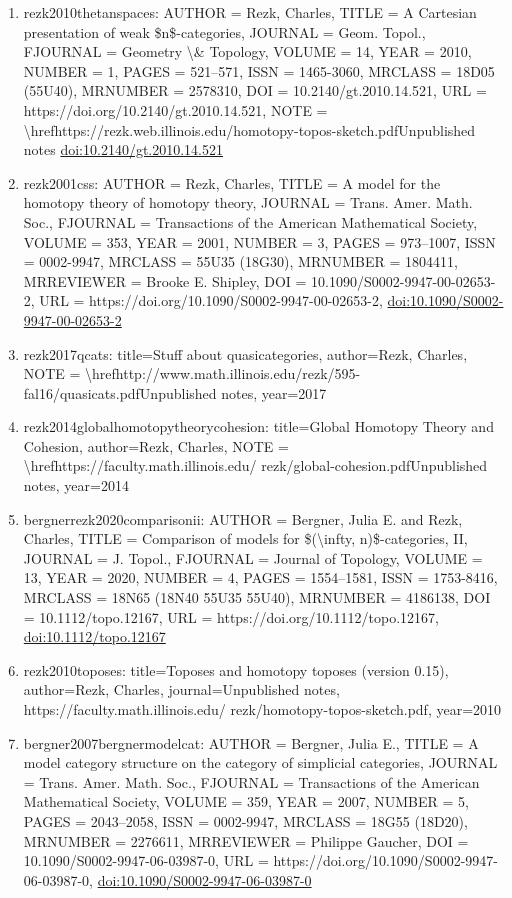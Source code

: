 \documentclass[11pt]{article}
\begin{document}
\begin{enumerate}[leftmargin=*]
  \item rezk2010thetanspaces: AUTHOR = Rezk, Charles, TITLE = A Cartesian presentation of weak \$n\$-categories, JOURNAL = Geom. Topol., FJOURNAL = Geometry \textbackslash{}\& Topology, VOLUME = 14, YEAR = 2010, NUMBER = 1, PAGES = 521--571, ISSN = 1465-3060, MRCLASS = 18D05 (55U40), MRNUMBER = 2578310, DOI = 10.2140/gt.2010.14.521, URL = https://doi.org/10.2140/gt.2010.14.521, NOTE = \textbackslash{}hrefhttps://rezk.web.illinois.edu/homotopy-topos-sketch.pdfUnpublished notes \href{https://doi.org/10.2140/gt.2010.14.521}{doi:10.2140/gt.2010.14.521}
  \item rezk2001css: AUTHOR = Rezk, Charles, TITLE = A model for the homotopy theory of homotopy theory, JOURNAL = Trans. Amer. Math. Soc., FJOURNAL = Transactions of the American Mathematical Society, VOLUME = 353, YEAR = 2001, NUMBER = 3, PAGES = 973--1007, ISSN = 0002-9947, MRCLASS = 55U35 (18G30), MRNUMBER = 1804411, MRREVIEWER = Brooke E. Shipley, DOI = 10.1090/S0002-9947-00-02653-2, URL = https://doi.org/10.1090/S0002-9947-00-02653-2, \href{https://doi.org/10.1090/S0002-9947-00-02653-2}{doi:10.1090/S0002-9947-00-02653-2}
  \item rezk2017qcats: title=Stuff about quasicategories, author=Rezk, Charles, NOTE = \textbackslash{}hrefhttp://www.math.illinois.edu/rezk/595-fal16/quasicats.pdfUnpublished notes, year=2017
  \item rezk2014globalhomotopytheorycohesion: title=Global Homotopy Theory and Cohesion, author=Rezk, Charles, NOTE = \textbackslash{}hrefhttps://faculty.math.illinois.edu/ rezk/global-cohesion.pdfUnpublished notes, year=2014
  \item bergnerrezk2020comparisonii: AUTHOR = Bergner, Julia E. and Rezk, Charles, TITLE = Comparison of models for \$(\textbackslash{}infty, n)\$-categories, II, JOURNAL = J. Topol., FJOURNAL = Journal of Topology, VOLUME = 13, YEAR = 2020, NUMBER = 4, PAGES = 1554--1581, ISSN = 1753-8416, MRCLASS = 18N65 (18N40 55U35 55U40), MRNUMBER = 4186138, DOI = 10.1112/topo.12167, URL = https://doi.org/10.1112/topo.12167, \href{https://doi.org/10.1112/topo.12167}{doi:10.1112/topo.12167}
  \item rezk2010toposes: title=Toposes and homotopy toposes (version 0.15), author=Rezk, Charles, journal=Unpublished notes, https://faculty.math.illinois.edu/ rezk/homotopy-topos-sketch.pdf, year=2010
  \item bergner2007bergnermodelcat: AUTHOR = Bergner, Julia E., TITLE = A model category structure on the category of simplicial categories, JOURNAL = Trans. Amer. Math. Soc., FJOURNAL = Transactions of the American Mathematical Society, VOLUME = 359, YEAR = 2007, NUMBER = 5, PAGES = 2043--2058, ISSN = 0002-9947, MRCLASS = 18G55 (18D20), MRNUMBER = 2276611, MRREVIEWER = Philippe Gaucher, DOI = 10.1090/S0002-9947-06-03987-0, URL = https://doi.org/10.1090/S0002-9947-06-03987-0, \href{https://doi.org/10.1090/S0002-9947-06-03987-0}{doi:10.1090/S0002-9947-06-03987-0}

\end{enumerate}
\end{document}
